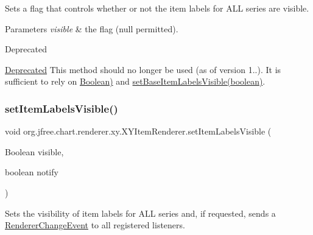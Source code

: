 Sets a flag that controls whether or not the item labels for A\+LL series are visible.


\begin{DoxyParams}{Parameters}
{\em visible} & the flag ({\ttfamily null} permitted).\\
\hline
\end{DoxyParams}
\begin{DoxyRefDesc}{Deprecated}
\item[\mbox{\hyperlink{deprecated__deprecated000225}{Deprecated}}]This method should no longer be used (as of version 1..). It is sufficient to rely on \mbox{\hyperlink{}{Boolean)}} and \mbox{\hyperlink{interfaceorg_1_1jfree_1_1chart_1_1renderer_1_1xy_1_1_x_y_item_renderer_ac684655063a646d75697136fd62a65aa}{set\+Base\+Item\+Labels\+Visible(boolean)}}. \end{DoxyRefDesc}
\mbox{\label{interfaceorg_1_1jfree_1_1chart_1_1renderer_1_1xy_1_1_x_y_item_renderer_a1f35e9f8af8e853e5abea2b63f67afd8}} 
\subsubsection{\texorpdfstring{set\+Item\+Labels\+Visible()}{setItemLabelsVisible()}\hspace{0.1cm}{\footnotesize\ttfamily [3/3]}}
{\footnotesize\ttfamily void org.\+jfree.\+chart.\+renderer.\+xy.\+X\+Y\+Item\+Renderer.\+set\+Item\+Labels\+Visible (\begin{DoxyParamCaption}\item[{Boolean}]{visible,  }\item[{boolean}]{notify }\end{DoxyParamCaption})}

Sets the visibility of item labels for A\+LL series and, if requested, sends a \mbox{\hyperlink{}{Renderer\+Change\+Event}} to all registered listeners.


